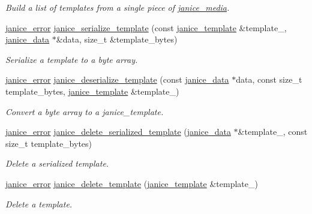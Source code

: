 \begin{DoxyCompactItemize}
\begin{DoxyCompactList}\small\item\em Build a list of templates from a single piece of \hyperlink{structjanice__media}{janice\+\_\+media}. \end{DoxyCompactList}\item 
\hyperlink{group__janice_ga4873d49c1f9d6a6880dfbd485cf6ba72}{janice\+\_\+error} \hyperlink{group__janice_ga1af08b4082e1f6eccd371e47a56ac72f}{janice\+\_\+serialize\+\_\+template} (const \hyperlink{group__janice_ga5593b06e86b90504968c0fc191ee2f3c}{janice\+\_\+template} \&template\+\_\+, \hyperlink{group__janice_ga63103e7e1c9df7d7403640223f3f6f07}{janice\+\_\+data} $\ast$\&data, size\+\_\+t \&template\+\_\+bytes)
\begin{DoxyCompactList}\small\item\em Serialize a template to a byte array. \end{DoxyCompactList}\item 
\hyperlink{group__janice_ga4873d49c1f9d6a6880dfbd485cf6ba72}{janice\+\_\+error} \hyperlink{group__janice_ga45f56e2332d2df100e8e4ebfe1e8ab1b}{janice\+\_\+deserialize\+\_\+template} (const \hyperlink{group__janice_ga63103e7e1c9df7d7403640223f3f6f07}{janice\+\_\+data} $\ast$data, const size\+\_\+t template\+\_\+bytes, \hyperlink{group__janice_ga5593b06e86b90504968c0fc191ee2f3c}{janice\+\_\+template} \&template\+\_\+)
\begin{DoxyCompactList}\small\item\em Convert a byte array to a janice\+\_\+template. \end{DoxyCompactList}\item 
\hyperlink{group__janice_ga4873d49c1f9d6a6880dfbd485cf6ba72}{janice\+\_\+error} \hyperlink{group__janice_ga7a36936977e0fcedd2f3326160417923}{janice\+\_\+delete\+\_\+serialized\+\_\+template} (\hyperlink{group__janice_ga63103e7e1c9df7d7403640223f3f6f07}{janice\+\_\+data} $\ast$\&template\+\_\+, const size\+\_\+t template\+\_\+bytes)
\begin{DoxyCompactList}\small\item\em Delete a serialized template. \end{DoxyCompactList}\item 
\hyperlink{group__janice_ga4873d49c1f9d6a6880dfbd485cf6ba72}{janice\+\_\+error} \hyperlink{group__janice_ga8090ee681808054b13b3ccc2dc7b287d}{janice\+\_\+delete\+\_\+template} (\hyperlink{group__janice_ga5593b06e86b90504968c0fc191ee2f3c}{janice\+\_\+template} \&template\+\_\+)
\begin{DoxyCompactList}\small\item\em Delete a template. \end{DoxyCompactList}\item 

\end{DoxyCompactItemize}
